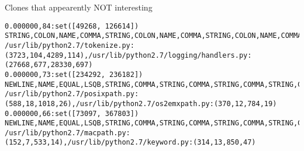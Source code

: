 \begin{frame}[shrink=30,fragile]{Clones that appearently \alert{NOT} interesting}

\lstset{
    breaklines=true
}

\begin{lstlisting}
0.000000,84:set([49268, 126614])	STRING,COLON,NAME,COMMA,STRING,COLON,NAME,COMMA,STRING,COLON,NAME,COMMA,STRING,COLON,NAME,COMMA,STRING,COLON,NAME,COMMA,STRING,COLON,NAME,COMMA,STRING,COLON,NAME,COMMA,STRING,COLON,NAME,COMMA,STRING,COLON,NAME,COMMA,STRING,COLON,NAME,COMMA,STRING,COLON,NAME,COMMA,STRING,COLON,NAME,COMMA,STRING,COLON,NAME,COMMA,STRING,COLON,NAME,COMMA,STRING,COLON,NAME,COMMA,STRING,COLON,NAME,COMMA,STRING,COLON,NAME,COMMA,STRING,COLON,NAME,COMMA,STRING,COLON,NAME,COMMA,STRING,COLON,NAME,COMMA,STRING,COLON,NAME,COMMA	/usr/lib/python2.7/tokenize.py:(3723,104,4289,114),/usr/lib/python2.7/logging/handlers.py:(27668,677,28330,697)
0.000000,73:set([234292, 236182])	NEWLINE,NAME,EQUAL,LSQB,STRING,COMMA,STRING,COMMA,STRING,COMMA,STRING,COMMA,STRING,COMMA,STRING,COMMA,STRING,COMMA,STRING,COMMA,STRING,COMMA,STRING,COMMA,STRING,COMMA,STRING,COMMA,STRING,COMMA,STRING,COMMA,STRING,COMMA,STRING,COMMA,STRING,COMMA,STRING,COMMA,STRING,COMMA,STRING,COMMA,STRING,COMMA,STRING,COMMA,STRING,COMMA,STRING,COMMA,STRING,COMMA,STRING,COMMA,STRING,COMMA,STRING,COMMA,STRING,COMMA,STRING,COMMA,STRING,COMMA,STRING,COMMA,STRING,COMMA,STRING,COMMA,STRING	/usr/lib/python2.7/posixpath.py:(588,18,1018,26),/usr/lib/python2.7/os2emxpath.py:(370,12,784,19)
0.000000,66:set([73097, 367803])	NEWLINE,NAME,EQUAL,LSQB,STRING,COMMA,STRING,COMMA,STRING,COMMA,STRING,COMMA,STRING,COMMA,STRING,COMMA,STRING,COMMA,STRING,COMMA,STRING,COMMA,STRING,COMMA,STRING,COMMA,STRING,COMMA,STRING,COMMA,STRING,COMMA,STRING,COMMA,STRING,COMMA,STRING,COMMA,STRING,COMMA,STRING,COMMA,STRING,COMMA,STRING,COMMA,STRING,COMMA,STRING,COMMA,STRING,COMMA,STRING,COMMA,STRING,COMMA,STRING,COMMA,STRING,COMMA,STRING,COMMA,STRING,COMMA,STRING,COMMA	/usr/lib/python2.7/macpath.py:(152,7,533,14),/usr/lib/python2.7/keyword.py:(314,13,850,47)
\end{lstlisting}
\end{frame}

